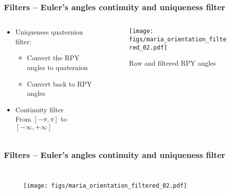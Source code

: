 \documentclass[aspectratio=1610]{beamer}
\begin{document}
\begin{frame}
\frametitle{Filters – Euler's angles continuity and uniqueness filter}
\begin{columns}
\begin{column}{0.5\textwidth}
  \begin{itemize}\itemsep1em
    \justifying
    \item Uniqueness quaternion filter:
    \begin{itemize}
      \item Convert the RPY angles to quaternion
      \item Convert back to RPY angles
    \end{itemize}
    \item Continuity filter \\
    From $[-\pi, \pi]$ to $[-\infty, +\infty]$
  \end{itemize}
\end{column}
\begin{column}{0.5\textwidth}  %
  \begin{figure}
    \centering
    \texttt{[image: figs/maria\_orientation\_filtered\_02.pdf]}
    \caption{Raw and filtered RPY angles}
  \end{figure}
\end{column}
\end{columns}

\end{frame}

\begin{frame}
\frametitle{Filters – Euler's angles continuity and uniqueness filter}
\begin{columns}
  \column{37em}
  \begin{figure}
    \centering
    \texttt{[image: figs/maria\_orientation\_filtered\_02.pdf]}
  \end{figure}
\end{columns}
\end{frame}
\end{document}
